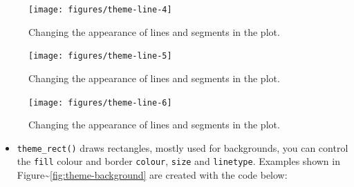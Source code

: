 \begin{Shaded}
\begin{Highlighting}[]
\StringTok{ }\NormalTok{(} \NormalTok{())}
\end{Highlighting}
\end{Shaded}

\begin{figure}
\texttt{[image: figures/theme-line-4]} \caption{Changing the appearance of lines and segments in the plot.\label{fig:theme-line4}}
\end{figure}

\begin{Shaded}
\begin{Highlighting}[]
\StringTok{ }\NormalTok{(} \NormalTok{(} \NormalTok{))}
\end{Highlighting}
\end{Shaded}

\begin{figure}
\texttt{[image: figures/theme-line-5]} \caption{Changing the appearance of lines and segments in the plot.\label{fig:theme-line5}}
\end{figure}

\begin{Shaded}
\begin{Highlighting}[]
\StringTok{ }\NormalTok{(} \NormalTok{(} \NormalTok{, } \NormalTok{))}
\end{Highlighting}
\end{Shaded}

\begin{figure}
\texttt{[image: figures/theme-line-6]} \caption{Changing the appearance of lines and segments in the plot.\label{fig:theme-line6}}
\end{figure}

\begin{itemize}
\itemsep1pt\parskip0pt
\item
  \texttt{theme\_rect()} draws rectangles, mostly used for backgrounds,
  you can control the \texttt{fill} colour and border \texttt{colour},
  \texttt{size} and \texttt{linetype}. Examples shown in
  Figure\textasciitilde{}\ref{fig:theme-background} are created with the
  code below:  
\end{itemize}

